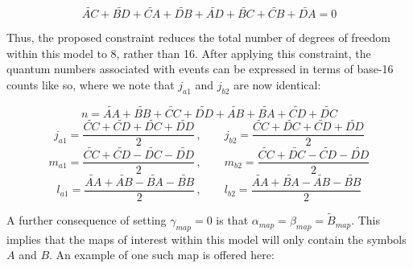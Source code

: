 \documentclass{article}
\begin{document}
\begin{equation}
    \widetilde{AC}+\widetilde{BD}+\widetilde{CA}+\widetilde{DB} + \widetilde{AD}+\widetilde{BC}+\widetilde{CB}+\widetilde{DA} = 0
\end{equation}

Thus, the proposed constraint reduces the total number of degrees of freedom within this model to 8, rather than 16. After applying this constraint, the quantum numbers associated with events can be expressed in terms of base-16 counts like so, where we note that $j_{a1}$ and $j_{b2}$ are now identical:

\begin{equation}
n=\widetilde{AA}+\widetilde{BB}+\widetilde{CC}+\widetilde{DD}+\widetilde{AB}+\widetilde{BA}+\widetilde{CD}+\widetilde{DC}
\label{eq: n rotation}
\end{equation}
\begin{equation}
j_{a1}=\frac{\widetilde{CC}+\widetilde{CD}+\widetilde{DC}+\widetilde{DD}}{2}\,,\qquad j_{b2}=\frac{\widetilde{CC}+\widetilde{DC}+\widetilde{CD}+\widetilde{DD}}{2}\label{eq: j rotation}
\end{equation}
\begin{equation}
m_{a1}=\frac{\widetilde{CC}+\widetilde{CD}-\widetilde{DC}-\widetilde{DD}}{2}\,,\qquad m_{b2}=\frac{\widetilde{CC}+\widetilde{DC}-\widetilde{CD}-\widetilde{DD}}{2}\label{eq: m rotation}
\end{equation}
\begin{equation}
l_{a1}=\frac{\widetilde{AA}+\widetilde{AB}-\widetilde{BA}-\widetilde{BB}}{2}\,,\qquad l_{b2}=\frac{\widetilde{AA}+\widetilde{BA}-\widetilde{AB}-\widetilde{BB}}{2}\label{eq: l rotation}
\end{equation}

A further consequence of setting $\gamma_{map}=0$ is that $\alpha_{map}=\beta_{map}=\tilde{B}_{map}$. This implies that the maps of interest within this model will only contain the symbols $A$ and $B$. An example of one such map is offered here: 
\end{document}
